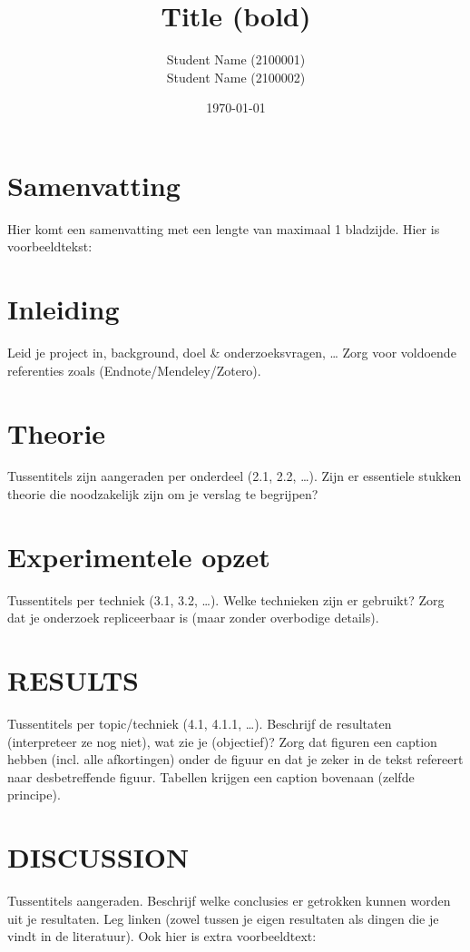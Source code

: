 \documentclass{uhphysreport}
\title{Title (bold)}
\date{\today}
\author{Student Name (2100001) \\ Student Name (2100002)} %
\begin{document}
\maketitle

\thispagestyle{fancy}
\section*{Samenvatting}
Hier komt een samenvatting met een lengte van maximaal 1 bladzijde. 
Hier is voorbeeldtekst: \lipsum[1-1]

\cleardoublepage
\tableofcontents
\clearpage


\section{Inleiding}
Leid je project in, background, doel \& onderzoeksvragen, \dots 
Zorg voor voldoende referenties zoals \cite{knuth:1984} \cite{latex2e}(Endnote/Mendeley/Zotero).

\section{Theorie}
Tussentitels zijn aangeraden per onderdeel (2.1, 2.2, \dots).
Zijn er essentiele stukken theorie die noodzakelijk zijn om je verslag te begrijpen?

\section{Experimentele opzet}
Tussentitels per techniek (3.1, 3.2, \dots).
Welke technieken zijn er gebruikt?
Zorg dat je onderzoek repliceerbaar is (maar zonder overbodige details).

\section{RESULTS}
Tussentitels per topic/techniek (4.1, 4.1.1, \dots).
Beschrijf de resultaten (interpreteer ze nog niet), wat zie je (objectief)?
Zorg dat figuren een caption hebben (incl. alle afkortingen) onder de figuur en dat je zeker in de tekst refereert naar desbetreffende figuur. 
Tabellen krijgen een caption bovenaan (zelfde principe).

\section{DISCUSSION}
Tussentitels aangeraden.
Beschrijf welke conclusies er getrokken kunnen worden uit je resultaten. 
Leg linken (zowel tussen je eigen resultaten als dingen die je vindt in de literatuur).
\npar
Ook hier is extra voorbeeldtext: \lipsum[1-1]
\end{document}
